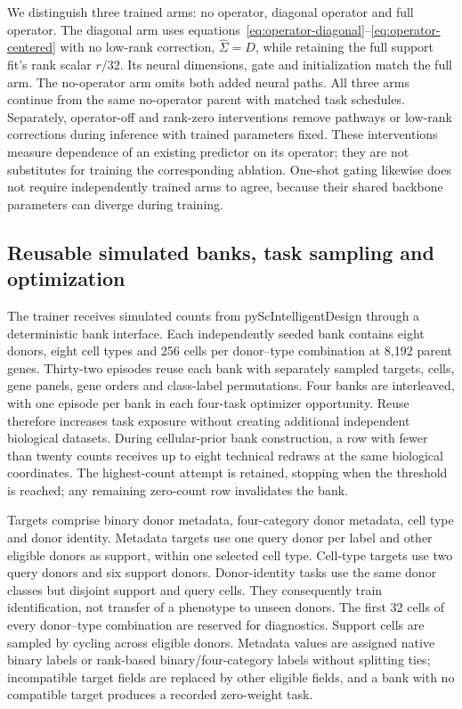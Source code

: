 We distinguish three trained arms: no operator, diagonal operator and full operator. The diagonal arm uses equations~\ref{eq:operator-diagonal}--\ref{eq:operator-centered} with no low-rank correction, $\widehat\Sigma=D$, while retaining the full support fit's rank scalar $r/32$. Its neural dimensions, gate and initialization match the full arm. The no-operator arm omits both added neural paths. All three arms continue from the same no-operator parent with matched task schedules. Separately, operator-off and rank-zero interventions remove pathways or low-rank corrections during inference with trained parameters fixed. These interventions measure dependence of an existing predictor on its operator; they are not substitutes for training the corresponding ablation. One-shot gating likewise does not require independently trained arms to agree, because their shared backbone parameters can diverge during training.

\subsection*{Reusable simulated banks, task sampling and optimization}
\label{methods:model-training}
The trainer receives simulated counts from pyScIntelligentDesign through a deterministic bank interface. Each independently seeded bank contains eight donors, eight cell types and 256 cells per donor--type combination at 8,192 parent genes. Thirty-two episodes reuse each bank with separately sampled targets, cells, gene panels, gene orders and class-label permutations. Four banks are interleaved, with one episode per bank in each four-task optimizer opportunity. Reuse therefore increases task exposure without creating additional independent biological datasets. During cellular-prior bank construction, a row with fewer than twenty counts receives up to eight technical redraws at the same biological coordinates. The highest-count attempt is retained, stopping when the threshold is reached; any remaining zero-count row invalidates the bank.

Targets comprise binary donor metadata, four-category donor metadata, cell type and donor identity. Metadata targets use one query donor per label and other eligible donors as support, within one selected cell type. Cell-type targets use two query donors and six support donors. Donor-identity tasks use the same donor classes but disjoint support and query cells. They consequently train identification, not transfer of a phenotype to unseen donors. The first 32 cells of every donor--type combination are reserved for diagnostics. Support cells are sampled by cycling across eligible donors. Metadata values are assigned native binary labels or rank-based binary/four-category labels without splitting ties; incompatible target fields are replaced by other eligible fields, and a bank with no compatible target produces a recorded zero-weight task.

